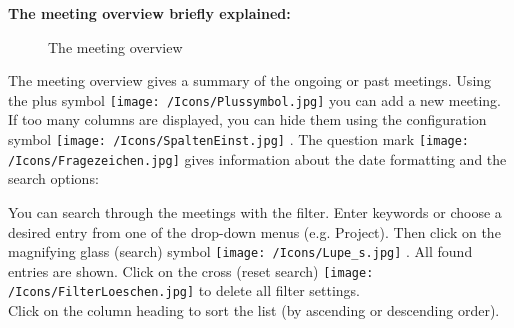 \vspace{5cm}

\pagebreak
\textbf{The meeting overview briefly explained:}

\begin{figure}[H]
\caption{The meeting overview}
\end{figure}

The meeting overview gives a summary of the ongoing or past meetings. Using the plus symbol \texttt{[image: /Icons/Plussymbol.jpg]}  you can add a new meeting. If too many columns are displayed, you can hide them using the configuration symbol \texttt{[image: /Icons/SpaltenEinst.jpg]} . The question mark \texttt{[image: /Icons/Fragezeichen.jpg]}  gives information about the date formatting and the search options: 

\begin{figure}[H]
\end{figure}

You can search through the meetings with the filter. Enter keywords or choose a desired entry from one of the drop-down menus (e.g. Project). Then click on the magnifying glass (search) symbol \texttt{[image: /Icons/Lupe\_s.jpg]} . All found entries are shown. Click on the cross (reset search) \texttt{[image: /Icons/FilterLoeschen.jpg]}  to delete all filter settings. \\
Click on the column heading to sort the list (by ascending or descending order).

